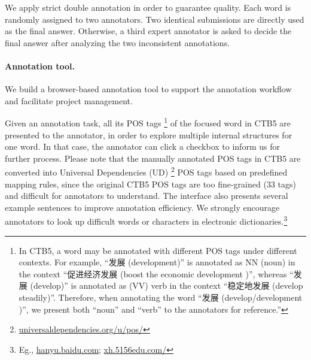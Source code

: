 We apply strict double annotation in order to guarantee quality. %
Each word 
is randomly assigned to two annotators. Two identical submissions are directly used as the final answer. Otherwise, a third expert annotator is asked to decide the final answer after analyzing the two inconsistent annotations. 

\paragraph{Annotation tool.} 
We build a browser-based annotation tool to support the annotation workflow and facilitate project management.

Given an annotation task, all its POS tags \footnote{In CTB5, a word may be annotated with different POS tags under different contexts. For example, ``发展 (development)'' is annotated as NN (noun) in the context ``促进经济发展 (boost the economic development )'', whereas ``发展 (develop)'' is annotated as (VV) verb in the context ``稳定地发展 (develop steadily)''. Therefore, when annotating the word ``发展 (develop/development )'', we present both ``noun'' and ``verb'' to the annotators for reference.''} of the focused word in CTB5 are presented to the annotator, in order to explore multiple internal structures for one word. 
In that case, the annotator can click a checkbox to inform us for further process. 
Please note that the manually annotated POS tags in CTB5 are converted into Universal Dependencies (UD) \footnote{\scriptsize{\url{universaldependencies.org/u/pos/}}} POS tags based on predefined mapping rules, since the original CTB5 POS tags are too fine-grained (33 tags) and difficult for annotators to understand.
The interface also presents several example sentences to improve annotation efficiency. We strongly encourage annotators to look up difficult words or characters in electronic dictionaries.\footnote{Eg., \url{hanyu.baidu.com}; \url{xh.5156edu.com/}} 



